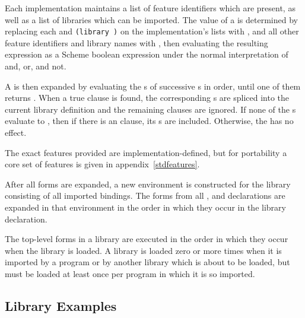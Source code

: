 Each implementation maintains a list of feature identifiers which are
present, as well as a list of libraries which can be imported.  The
value of a  is determined by replacing
each  and {\tt(library )}
on the implementation's lists with \schtrue, and all other feature
identifiers and library names with \schfalse, then evaluating the
resulting expression as a Scheme boolean expression under the normal
interpretation of {\cf and}, {\cf or}, and {\cf not}.

A  is then expanded by evaluating the
s of successive s
in order, until one of them returns \schtrue.  When a true clause is
found, the corresponding s are spliced into
the current library definition and the remaining clauses are ignored.
If none of the s evaluate to \schtrue, then
if there is an  clause, its s are
included.  Otherwise, the  has no effect.

The exact features provided are implementation-defined, but for
portability a core set of features is given in
appendix~\ref{stdfeatures}.


After all  forms are expanded, a new environment is
constructed for the library consisting of all imported bindings.  The
forms from all ,  and 
declarations are expanded in that environment in the order in which
they occur in the library declaration.

The top-level forms in a library are executed in the order in which
they occur when the library is loaded.  A library is loaded zero or more
times when it is imported by a program or by another library which is
about to be loaded, but must be loaded at least once per program in
which it is so imported.


\subsection{Library Examples}

